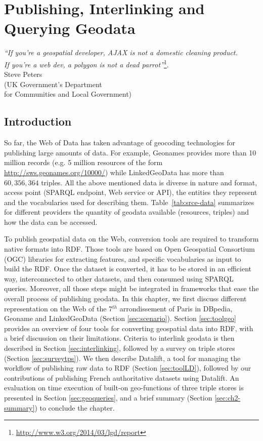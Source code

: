 
\chapter{Publishing, Interlinking and Querying Geodata}
\label{ch:ch2}

\begin{flushright}
\textit{``If you're a geospatial developer, AJAX is not a domestic cleaning product. \\
If you're a web dev, a polygon is not a dead parrot''}\footnote{\url{http://www.w3.org/2014/03/lgd/report}}.\\
Steve Peters \\
(UK Government's Department \\for Communities and Local Government)

\end{flushright}

\section*{Introduction}
\label{sec:intro-ch2}
So far, the Web of Data has taken advantage of geocoding technologies for publishing large amounts of data. For example, Geonames provides more than 10 million records (e.g. 5 million resources of the form \url{http://sws.geonames.org/10000/}) while LinkedGeoData has more than $60,356,364$ triples. All the above mentioned data is diverse in nature and format, access point (SPARQL endpoint, Web service or API), the entities they represent and the vocabularies used for describing them. Table~\ref{tab:srce-data} summarizes for different providers the quantity of geodata available (resources, triples) and how the data can be accessed.


To publish geospatial data on the Web, conversion tools are required to transform native formats into RDF. Those tools are based on Open Geospatial Consortium (OGC) libraries for extracting features, and specific vocabularies as input to build the RDF. Once the dataset is converted, it has to be stored in an efficient way, interconnected to other datasets, and then consumed using SPARQL queries. Moreover, all those steps might be integrated in frameworks that ease the overall process of publishing geodata. In this chapter, we first discuss different representation on the Web of the 7$^{th}$ arrondissement of Paris in DBpedia, Geoname and LinkedGeoData (Section \ref{sec:scenario}). Section \ref{sec:toolgeo} provides an overview of four tools for converting geospatial data into RDF, with a brief discussion on their limitations. Criteria to interlink geodata is then described in Section \ref{sec:interlinking}, followed by a survey on triple stores (Section \ref{sec:surveytps}). We then describe Datalift, a tool for managing the workflow of publishing raw data to RDF (Section \ref{sec:toolLD}), followed by our contributions of publishing French authoritative datasets using Datalift. An evaluation on time execution of built-on geo-functions of three triple stores is presented in Section \ref{sec:geoqueries}, and a brief summary (Section \ref{sec:ch2-summary}) to conclude the chapter.

